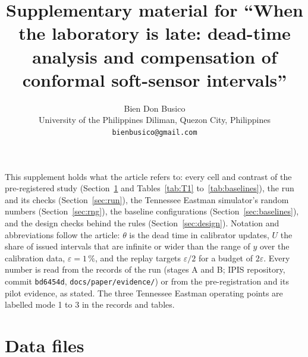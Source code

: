 \documentclass[10pt,a4paper]{article}
\title{Supplementary material for ``When the laboratory is late: dead-time analysis and
compensation of conformal soft-sensor intervals''}
\author{Bien Don Busico\\
\small University of the Philippines Diliman, Quezon City, Philippines\\
\small \texttt{bienbusico@gmail.com}}
\date{}
\begin{document}
\maketitle

This supplement holds what the article refers to: every cell and contrast of the pre-registered
study (Section~\ref{sec:files} and Tables~\ref{tab:T1} to~\ref{tab:baselines}), the run and its
checks (Section~\ref{sec:run}), the Tennessee Eastman simulator's random numbers
(Section~\ref{sec:rng}), the baseline configurations (Section~\ref{sec:baselines}), and the design
checks behind the rules (Section~\ref{sec:design}). Notation and abbreviations follow the article:
$\theta$ is the dead time in calibrator updates, $U$ the share of issued intervals that are
infinite or wider than the range of $y$ over the calibration data, $\varepsilon = 1\,\%$, and the
replay targets $\varepsilon/2$ for a budget of $2\varepsilon$. Every number is read from the records
of the run (stages A and B; IPIS repository, commit \texttt{bd6454d},
\texttt{docs/paper/evidence/}) or from the pre-registration and its pilot evidence, as stated. The
three Tennessee Eastman operating points are labelled mode 1 to 3 in the records and tables.

\section{Data files}\label{sec:files}
\end{document}

